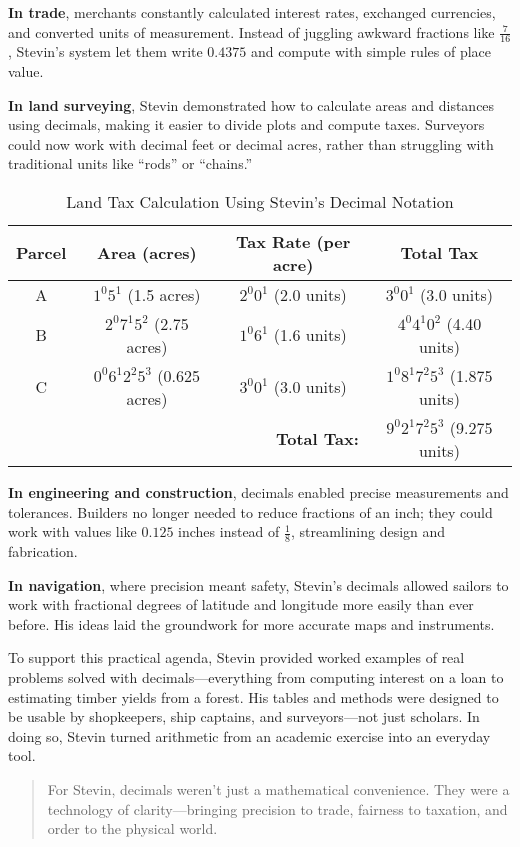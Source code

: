 \textbf{In trade}, merchants constantly calculated interest rates, exchanged currencies, and converted units of measurement. Instead of juggling awkward fractions like \( \frac{7}{16} \), Stevin’s system let them write \( 0.4375 \) and compute with simple rules of place value.

\textbf{In land surveying}, Stevin demonstrated how to calculate areas and distances using decimals, making it easier to divide plots and compute taxes. Surveyors could now work with decimal feet or decimal acres, rather than struggling with traditional units like “rods” or “chains.”

\begin{table}[H]
    \centering
    \caption{Land Tax Calculation Using Stevin’s Decimal Notation}
    \renewcommand{\arraystretch}{1.3}
    \begin{tabular}{|c|c|c|c|}
    \hline
    \textbf{Parcel} & \textbf{Area (acres)} & \textbf{Tax Rate (per acre)} & \textbf{Total Tax} \\
    \hline
    A & $1^{0}5^{1}$ (1.5 acres) & $2^{0}0^{1}$ (2.0 units) & $3^{0}0^{1}$ (3.0 units) \\
    B & $2^{0}7^{1}5^{2}$ (2.75 acres) & $1^{0}6^{1}$ (1.6 units) & $4^{0}4^{1}0^{2}$ (4.40 units) \\
    C & $0^{0}6^{1}2^{2}5^{3}$ (0.625 acres) & $3^{0}0^{1}$ (3.0 units) & $1^{0}8^{1}7^{2}5^{3}$ (1.875 units) \\
    \hline
    \multicolumn{3}{|r|}{\textbf{Total Tax:}} & $9^{0}2^{1}7^{2}5^{3}$ (9.275 units) \\
    \hline
    \end{tabular}
\end{table}

\textbf{In engineering and construction}, decimals enabled precise measurements and tolerances. Builders no longer needed to reduce fractions of an inch; they could work with values like \( 0.125 \) inches instead of \( \frac{1}{8} \), streamlining design and fabrication.

\textbf{In navigation}, where precision meant safety, Stevin’s decimals allowed sailors to work with fractional degrees of latitude and longitude more easily than ever before. His ideas laid the groundwork for more accurate maps and instruments.

To support this practical agenda, Stevin provided worked examples of real problems solved with decimals—everything from computing interest on a loan to estimating timber yields from a forest. His tables and methods were designed to be usable by shopkeepers, ship captains, and surveyors—not just scholars. In doing so, Stevin turned arithmetic from an academic exercise into an everyday tool.

\begin{quote}
For Stevin, decimals weren’t just a mathematical convenience. They were a technology of clarity—bringing precision to trade, fairness to taxation, and order to the physical world.
\end{quote}



